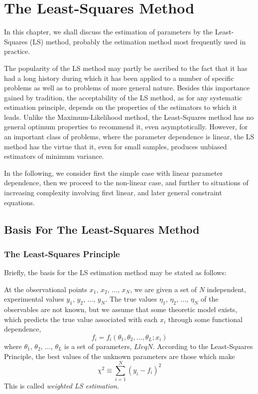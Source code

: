 \documentclass[../main.tex]{subfiles}
\begin{document}
\chapter{The Least-Squares Method}

In this chapter, we shall discuss the estimation of parameters by the Least-Squares (LS) method,
probably the estimation method most frequently used in practice.

The popularity of the LS method may partly be ascribed to the fact that
it has had a long history during which it has been applied to a number of specific problems as well as to problems of more general nature.
Besides this importance gained by tradition,
the acceptability of the LS method,
as for any systematic estimation principle,
depends on the properties of the estimators to which it leads.
Unlike the Maximum-Likelihood method,
the Least-Squares method has no general optimum properties to recommend it,
even asymptotically.
However, for an important class of problems, where the parameter dependence is linear,
the LS method has the virtue that it,
even for small samples,
produces unbiased estimators of minimum variance.

In the following,
we consider first the simple case with linear parameter dependence,
then we proceed to the non-linear case,
and further to situations of increasing complexity involving first linear,
and later general constraint equations.

\section{Basis For The Least-Squares Method} \label{sec:10.1}

\subsection{The Least-Squares Principle} \label{sec:10.1.1}

Briefly, the basis for the LS estimation method may be stated as follows:

At the observational points $x_1$, $x_2$, $\ldots$, $x_N$,
we are given a set of $N$ independent, experimental values $y_1$, $y_2$, $\ldots$, $y_N$.
The true values $\eta_1$, $\eta_2$, $\ldots$, $\eta_N$ of the observables are not known,
but we assume that some theoretic model exists,
which predicts the true value associated with each $x_i$ through some functional dependence,
%
\begin{equation}
    f_i = f_i(\theta_1, \theta_2, \ldots, \theta_L; x_i)
\end{equation}
%
where $\theta_1$, $\theta_2$, $\ldots$, $\theta_L$ is a set of parameters, $L leq N$.
According to the Least-Squares Principle,
the best values of the unknown parameters are those which make
%
\begin{equation}
    \chi^2 \equiv \sum_{i=1}^N (y_i - f_i)^2
    \label{eq:10.2}
\end{equation}
%
This is called \emph{weighted LS estimation}.
\end{document}
